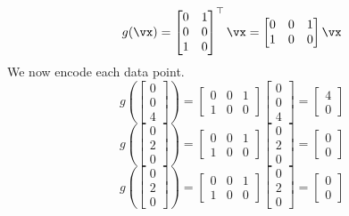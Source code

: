\begin{enumerate}
    $$g(\vx) = \begin{bmatrix} 0 & 1\\ 0 & 0\\ 1 & 0 \end{bmatrix}^\top \vx = \begin{bmatrix} 0 & 0 & 1\\ 1 & 0 & 0 \end{bmatrix} \vx$$
    We now encode each data point.
    $$g\left(\begin{bmatrix} 0\\ 0\\ 4 \end{bmatrix}\right) = \begin{bmatrix} 0 & 0 & 1\\ 1 & 0 & 0 \end{bmatrix} \begin{bmatrix} 0\\ 0\\ 4 \end{bmatrix} = \begin{bmatrix} 4\\ 0 \end{bmatrix}$$
    $$g\left(\begin{bmatrix} 0\\ 2\\ 0 \end{bmatrix}\right) = \begin{bmatrix} 0 & 0 & 1\\ 1 & 0 & 0 \end{bmatrix} \begin{bmatrix} 0\\ 2\\ 0 \end{bmatrix} = \begin{bmatrix} 0\\ 0 \end{bmatrix}$$
    $$g\left(\begin{bmatrix} 0\\ 2\\ 0 \end{bmatrix}\right) = \begin{bmatrix} 0 & 0 & 1\\ 1 & 0 & 0 \end{bmatrix} \begin{bmatrix} 0\\ 2\\ 0 \end{bmatrix} = \begin{bmatrix} 0\\ 0 \end{bmatrix}$$

\end{enumerate}

